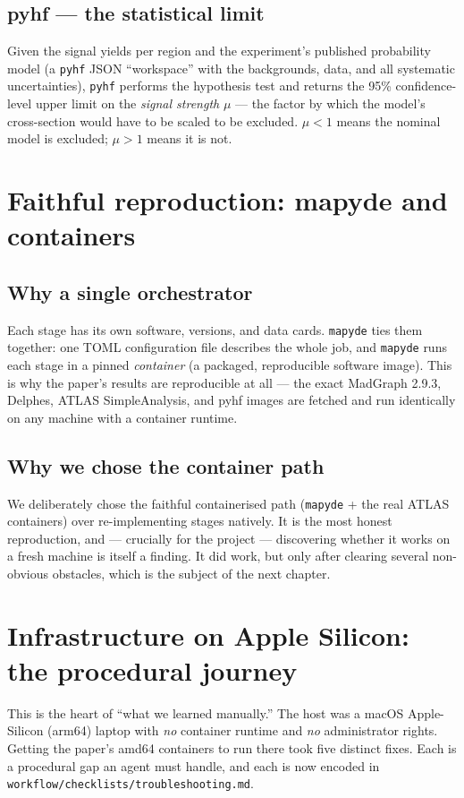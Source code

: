\documentclass[11pt,oneside]{report}
\newcommand{\code}[1]{\texttt{#1}}
\begin{document}
\section{pyhf --- the statistical limit}
Given the signal yields per region and the experiment's published probability model (a \code{pyhf}
JSON ``workspace'' with the backgrounds, data, and all systematic uncertainties), \code{pyhf}
performs the hypothesis test and returns the 95\% confidence-level upper limit on the
\emph{signal strength} $\mu$ --- the factor by which the model's cross-section would have to be
scaled to be excluded. $\mu<1$ means the nominal model is excluded; $\mu>1$ means it is not.

\chapter{Faithful reproduction: mapyde and containers}
\label{ch:mapyde}
\section{Why a single orchestrator}
Each stage has its own software, versions, and data cards. \code{mapyde} ties them together: one
TOML configuration file describes the whole job, and \code{mapyde} runs each stage in a pinned
\emph{container} (a packaged, reproducible software image). This is why the paper's results are
reproducible at all --- the exact MadGraph 2.9.3, Delphes, ATLAS SimpleAnalysis, and pyhf images
are fetched and run identically on any machine with a container runtime.

\section{Why we chose the container path}
We deliberately chose the faithful containerised path (\code{mapyde} + the real ATLAS containers)
over re-implementing stages natively. It is the most honest reproduction, and --- crucially for the
project --- discovering whether it works on a fresh machine is itself a finding. It did work, but
only after clearing several non-obvious obstacles, which is the subject of the next chapter.

\chapter{Infrastructure on Apple Silicon: the procedural journey}
\label{ch:infra}
This is the heart of ``what we learned manually.'' The host was a macOS Apple-Silicon (arm64)
laptop with \emph{no} container runtime and \emph{no} administrator rights. Getting the paper's
amd64 containers to run there took five distinct fixes. Each is a procedural gap an agent must
handle, and each is now encoded in \code{workflow/checklists/troubleshooting.md}.
\end{document}
